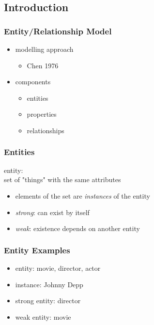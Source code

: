 \documentclass[dvipsnames]{beamer}
\begin{document}
\subsection{Introduction}

\begin{frame}
  \frametitle{Entity/Relationship Model}

  \begin{itemize}
    \item modelling approach
    \begin{itemize}
      \item Chen 1976
    \end{itemize}

    \pause
    \item components
    \begin{itemize}
      \item entities
      \item properties
      \item relationships
    \end{itemize}
  \end{itemize}
\end{frame}

\begin{frame}
  \frametitle{Entities}

  \begin{definition}
    \alert{entity}:\\
      set of "things" with the same attributes

    \pause
    \begin{itemize}
      \item elements of the set are \emph{instances} of the entity
    \end{itemize}

    \pause
    \begin{itemize}
      \item \emph{strong}: can exist by itself
      \item \emph{weak}: existence depends on another entity
    \end{itemize}
  \end{definition}
\end{frame}

\begin{frame}
  \frametitle{Entity Examples}

  \begin{example}
    \begin{itemize}
      \item entity: movie, director, actor

      \pause
      \item instance: Johnny Depp

      \pause
      \medskip
      \item strong entity: director
      \item weak entity: movie
    \end{itemize}
  \end{example}
\end{frame}
\end{document}
